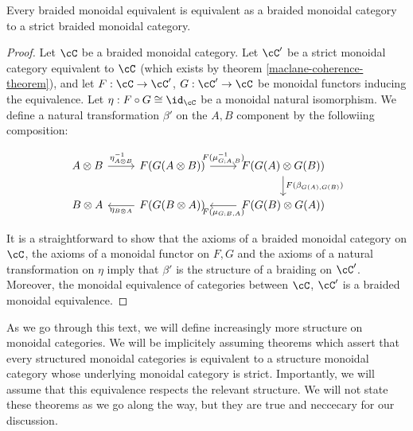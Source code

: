 \begin{prop}\label{braided-coherence-theorem} Every braided monoidal equivalent is equivalent as a braided monoidal category to a strict braided monoidal category.
\end{prop}
\begin{proof} Let $\cC$ be a braided monoidal category. Let $\cC'$ be a strict monoidal category equivalent to $\cC$ (which exists by theorem \ref{maclane-coherence-theorem}), and let $F:\cC\to\cC'$, $G:\cC'\to \cC$ be monoidal functors inducing the equivalence. Let $\eta:F\circ G\cong \id_{\cC}$ be a monoidal natural isomorphism. We define a natural transformation $\beta'$ on the $A,B$ component by the followiing composition:

\[\begin{tikzcd}
	{A\otimes B} & {F(G(A\otimes B))} & {F(G(A)\otimes G(B))} \\
	{B\otimes A} & {F(G(B\otimes A))} & {F(G(B)\otimes G(A))}
	\arrow["{\eta^{-1}_{A\otimes B}}", from=1-1, to=1-2]
	\arrow["{F(\mu^{-1}_{G;A,B})}", from=1-2, to=1-3]
	\arrow["{F(\beta_{G(A),G(B)})}", from=1-3, to=2-3]
	\arrow["{\eta_{B\otimes A}}", from=2-2, to=2-1]
	\arrow["{F(\mu_{G;B,A})}", from=2-3, to=2-2]
\end{tikzcd}\]

It is a straightforward to show that the axioms of a braided monoidal category on $\cC$, the axioms of a monoidal functor on $F,G$ and the axioms of a natural transformation on $\eta$ imply that $\beta'$ is the structure of a braiding on $\cC'$. Moreover, the monoidal equivalence of categories between $\cC$, $\cC'$ is a braided monoidal equivalence.
\end{proof}

\begin{rem}
As we go through this text, we will define increasingly more structure on monoidal categories. We will be implicitely assuming theorems which assert that every structured monoidal categories is equivalent to a structure monoidal category whose underlying monoidal category is strict. Importantly, we will assume that this equivalence respects the relevant structure. We will not state these theorems as we go along the way, but they are true and neccecary for our discussion.
\end{rem}


